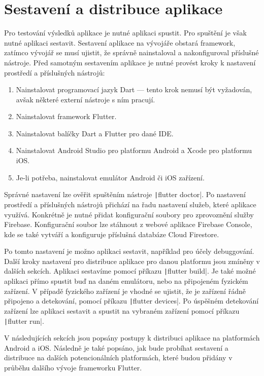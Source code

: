 \chapter{Sestavení a distribuce aplikace}

Pro testování výsledků aplikace je nutné aplikaci spustit.
Pro spuštění je však nutné aplikaci sestavit.
Sestavení aplikace na vývojáře obstará framework,
zatímco vývojář se musí ujistit,
že správně nainstaloval a nakonfiguroval příslušné nástroje.
Před samotným sestavením aplikace je nutné provést kroky k nastavení prostředí
a příslušných nástrojů:

\begin{enumerate}
    \item Nainstalovat programovací jazyk Dart
    --- tento krok nemusí být vyžadován,
    avšak některé externí nástroje s ním pracují.
    \item Nainstalovat framework Flutter.
    \item Nainstalovat balíčky Dart a Flutter pro dané IDE.
    \item Nainstalovat Android Studio pro platformu Android
    a Xcode pro platformu iOS.
    \item Je-li potřeba, nainstalovat emulátor Android či iOS zařízení.
\end{enumerate}

Správné nastavení lze ověřit spuštěním nástroje
\texttt|flutter doctor|.
Po nastavení prostředí a příslušných nástrojů přichází na řadu nastavení služeb,
které aplikace využívá.
Konkrétně je nutné přidat konfigurační soubory pro zprovoznění služby Firebase.
Konfigurační soubor lze stáhnout z webové aplikace Firebase Console,
kde se také vytváří a konfiguruje příslušná databáze Cloud Firestore. 

Po tomto nastavení je možno aplikaci sestavit,
například pro účely debuggování.
Další kroky nastavení pro distribuce aplikace pro danou platformu jsou
zmíněny v dalších sekcích.
Aplikaci sestavíme pomocí příkazu \texttt|flutter build|.
Je také možné aplikaci přímo spustit buď na daném emulátoru,
nebo na připojeném fyzickém zařízení.
V případě fyzického zařízení je vhodné se ujistit,
že je zařízení řádně připojeno a detekování,
pomocí příkazu \texttt|flutter devices|.
Po úspěšném detekování zařízení lze aplikaci sestavit a spustit na vybraném
zařízení pomocí příkazu \texttt|flutter run|. 

V následujících sekcích jsou popsány postupy k distribuci aplikace na
platformách Android a iOS.
Následně je také popsáno,
jak bude probíhat sestavení a distribuce na dalších potencionálních
platformách,
které budou přidány v průběhu dalšího vývoje frameworku Flutter.




